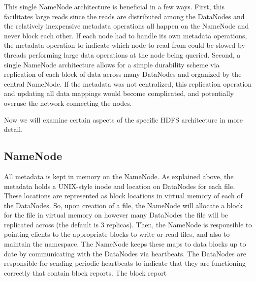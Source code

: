 \documentclass[11pt, a4paper]{article}
\begin{document}
\begin{multicols*}{2}

This single NameNode architecture is beneficial in a few ways. First, this facilitates large reads since the reads are distributed among the DataNodes and the relatively inexpensive metadata operations all happen on the NameNode and never block each other. If each node had to handle its own metadata operations, the metadata operation to indicate which node to read from could be slowed by threads performing large data operations at the node being queried. Second, a single NameNode architecture allows for a simple durability scheme via replication of each block of data across many DataNodes and organized by the central NameNode. If the metadata was not centralized, this replication operation and updating all data mappings would become complicated, and potentially overuse the network connecting the nodes.

Now we will examine certain aspects of the specific HDFS architecture in more detail. 

\subsection{NameNode}


All metadata is kept in memory on the NameNode. As explained above, the metadata holds a UNIX-style inode and location on DataNodes for each file. These locations are represented as block locations in virtual memory of each of the DataNodes. So, upon creation of a file, the NameNode will allocate a block for the file in virtual memory on however many DataNodes the file will be replicated across (the default is 3 replicas). Then, the NameNode is responsible to pointing clients to the appropriate blocks to write or read files, and also to maintain the namespace. The NameNode keeps these maps to data blocks up to date by communicating with the DataNodes via heartbeats. The DataNodes are responsible for sending periodic heartbeats to indicate that they are functioning correctly that contain block reports. The block report  


\end{multicols*}
\end{document}
